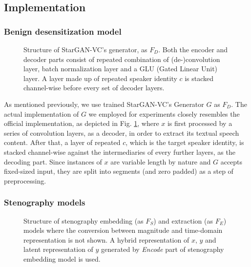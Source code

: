 \documentclass[journal]{IEEEtran} %
\begin{document}
\subsection{Implementation}

\subsubsection{Benign desensitization model}

\begin{figure}[!t]
    \caption{Structure of StarGAN-VC's generator, as $F_D$. Both the encoder and decoder parts consist of repeated combination of (de-)convolution layer, batch normalization layer and a GLU (Gated Linear Unit) layer. A layer made up of repeated speaker identity $c$ is stacked channel-wise before every set of decoder layers.}
    \label{fig:sgvc_impl}
\end{figure}

As mentioned previously, we use trained StarGAN-VC's Generator $G$ as $F_D$. The actual implementation of $G$ we employed for experiments closely resembles the official implementation, as depicted in Fig. \ref{fig:sgvc_impl}, where $x$ is first processed by a series of convolution layers, as a decoder, in order to extract its textual speech content. After that, a layer of repeated $c$, which is the target speaker identity, is stacked channel-wise against the intermediaries of every further layers, as the decoding part. Since instances of $x$ are variable length by nature and $G$ accepts fixed-sized input, they are split into segments (and zero padded) as a step of preprocessing.

\subsubsection{Stenography models}

\begin{figure}[!t]
    \caption{Structure of stenography embedding (as $F_S$) and extraction (as $F_E$) models where the conversion between magnitude and time-domain representation is not shown. A hybrid representation of $x$, $y$ and latent representation of $y$ generated by \textit{Encode} part of stenography embedding model is used.}
    \label{fig:steno_impl}
\end{figure}
\end{document}
